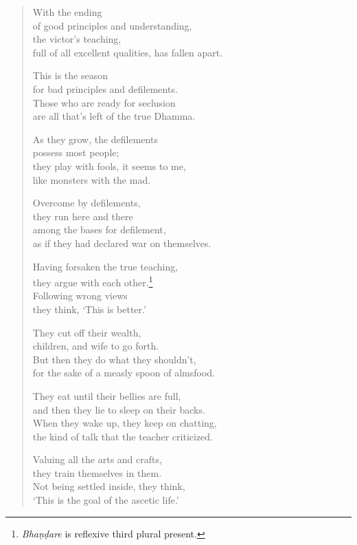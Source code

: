 \documentclass[12pt,openany]{book}%
\begin{document}
\begin{verse}
With the ending \\
of good principles and understanding, \\
the victor’s teaching, \\
full of all excellent qualities, has fallen apart. 

This is the season \\
for bad principles and defilements. \\
Those who are ready for seclusion \\
are all that’s left of the true Dhamma. 

As they grow, the defilements \\
possess most people; \\
they play with fools, it seems to me, \\
like monsters with the mad. 

Overcome by defilements, \\
they run here and there \\
among the bases for defilement, \\
as if they had declared war on themselves. 

Having forsaken the true teaching, \\
they argue with each other.\footnote{\textit{\textsanskrit{Bhaṇḍare}} is reflexive third plural present. } \\
Following wrong views \\
they think, ‘This is better.’ 

They cut off their wealth, \\
children, and wife to go forth. \\
But then they do what they shouldn’t, \\
for the sake of a measly spoon of almsfood. 

They eat until their bellies are full, \\
and then they lie to sleep on their backs. \\
When they wake up, they keep on chatting, \\
the kind of talk that the teacher criticized. 

Valuing all the arts and crafts, \\
they train themselves in them. \\
Not being settled inside, they think, \\
‘This is the goal of the ascetic life.’ 


\end{verse}
\end{document}
